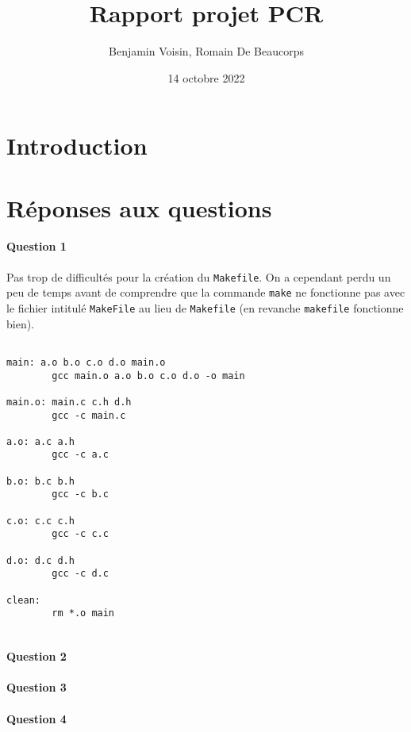 \documentclass{article}
\title{Rapport projet PCR}
\author{Benjamin Voisin, Romain De Beaucorps}
\date{14 octobre 2022}
\begin{document}
\maketitle

\section{Introduction}

\section{Réponses aux questions}

\paragraph{Question 1} Pas trop de difficultés pour la création du \texttt{Makefile}. On a cependant perdu un peu de temps avant de comprendre que la commande \texttt{make} ne fonctionne pas avec le fichier intitulé \texttt{MakeFile} au lieu de \texttt{Makefile} (en revanche \texttt{makefile} fonctionne bien).

\begin{verbatim}

main: a.o b.o c.o d.o main.o 
        gcc main.o a.o b.o c.o d.o -o main

main.o: main.c c.h d.h
        gcc -c main.c

a.o: a.c a.h
        gcc -c a.c

b.o: b.c b.h 
        gcc -c b.c

c.o: c.c c.h
        gcc -c c.c

d.o: d.c d.h
        gcc -c d.c

clean:
        rm *.o main


\end{verbatim}

\paragraph{Question 2}


\paragraph{Question 3}

\paragraph{Question 4}
\end{document}
